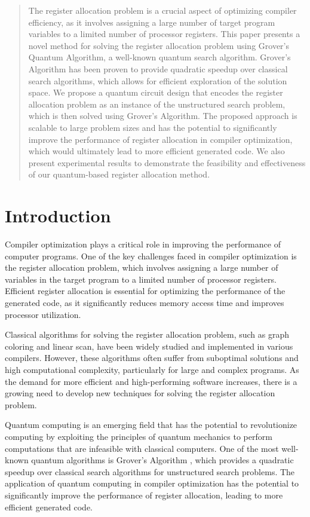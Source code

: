 \begin{abstract}
The register allocation problem is a crucial aspect of optimizing compiler efficiency, as it involves assigning a large number of target program variables to a limited number of processor registers. This paper presents a novel method for solving the register allocation problem using Grover's Quantum Algorithm, a well-known quantum search algorithm. Grover's Algorithm has been proven to provide quadratic speedup over classical search algorithms, which allows for efficient exploration of the solution space. We propose a quantum circuit design that encodes the register allocation problem as an instance of the unstructured search problem, which is then solved using Grover's Algorithm. The proposed approach is scalable to large problem sizes and has the potential to significantly improve the performance of register allocation in compiler optimization, which would ultimately lead to more efficient generated code. We also present experimental results to demonstrate the feasibility and effectiveness of our quantum-based register allocation method.

\end{abstract}

\section{Introduction}

Compiler optimization plays a critical role in improving the performance of computer programs. One of the key challenges faced in compiler optimization is the register allocation problem, which involves assigning a large number of variables in the target program to a limited number of processor registers. Efficient register allocation is essential for optimizing the performance of the generated code, as it significantly reduces memory access time and improves processor utilization.

Classical algorithms for solving the register allocation problem, such as graph coloring and linear scan, have been widely studied and implemented in various compilers. However, these algorithms often suffer from suboptimal solutions and high computational complexity, particularly for large and complex programs. As the demand for more efficient and high-performing software increases, there is a growing need to develop new techniques for solving the register allocation problem.

Quantum computing is an emerging field that has the potential to revolutionize computing by exploiting the principles of quantum mechanics to perform computations that are infeasible with classical computers. One of the most well-known quantum algorithms is Grover's Algorithm \cite{grover1996}, which provides a quadratic speedup over classical search algorithms for unstructured search problems. The application of quantum computing in compiler optimization has the potential to significantly improve the performance of register allocation, leading to more efficient generated code.

